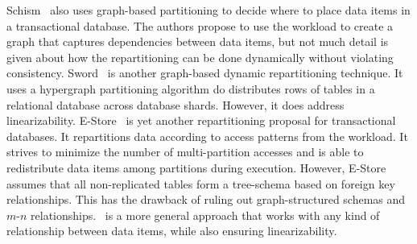 Schism~\cite{curino2010sch} also uses graph-based partitioning to decide where to place data items in a transactional database.
The authors propose to use the workload to create a graph that captures dependencies between data items, but not much detail is given about how the repartitioning can be done dynamically without violating consistency.
Sword~\cite{quamar2013sword} is another graph-based dynamic repartitioning technique.
It uses a hypergraph partitioning algorithm do distributes rows of tables in a relational database across database shards.
However, it does address linearizability.
E-Store~\cite{taft2014est} is yet another repartitioning proposal for transactional databases.
It repartitions data according to access patterns from the workload.
It strives to minimize the number of multi-partition accesses and is able to redistribute data items among partitions during execution.
However, E-Store assumes that all non-replicated tables form a tree-schema based on foreign key relationships.
This has the drawback of ruling out graph-structured schemas and \mbox{$m$-$n$} relationships.
\dynastar\ is a more general approach that works with any kind of relationship between data items, while also ensuring linearizability.